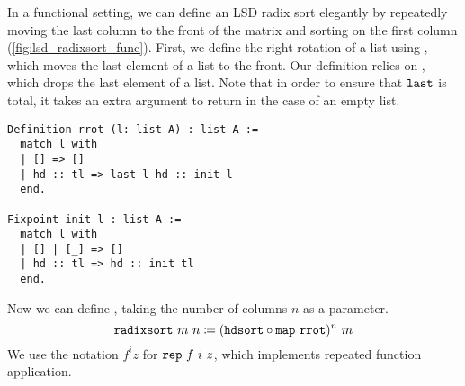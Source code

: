 \documentclass[sigplan,10pt,anonymous,review]{thesis}
\begin{document}
In a functional setting, we can define an LSD radix sort elegantly by
repeatedly moving the last column to the front of the matrix and
sorting on the first column (\cref{fig:lsd_radixsort_func}). First, we
define the right rotation of a list using , which moves the
last element of a list to the front. Our definition relies on
, which drops the last element of a list. Note that in order
to ensure that $\texttt{\textup{last}}$ is total, it takes an extra argument to
return in the case of an empty list.
\begin{lstlisting}
Definition rrot (l: list A) : list A :=
  match l with
  | [] => []
  | hd :: tl => last l hd :: init l
  end.

Fixpoint init l : list A :=
  match l with
  | [] | [_] => []
  | hd :: tl => hd :: init tl
  end.
\end{lstlisting}

Now we can define , taking the number of columns $n$ as
a parameter.
\begin{equation*}
  \texttt{\textup{radixsort}}~m~n \coloneq (\texttt{\textup{hdsort}} \circ \texttt{\textup{map}}~\texttt{\textup{rrot}})^n~m
\end{equation*}
We use the notation $f^i z$ for $\texttt{\textup{rep}}~f~i~z$, which implements
repeated function application.
\end{document}
